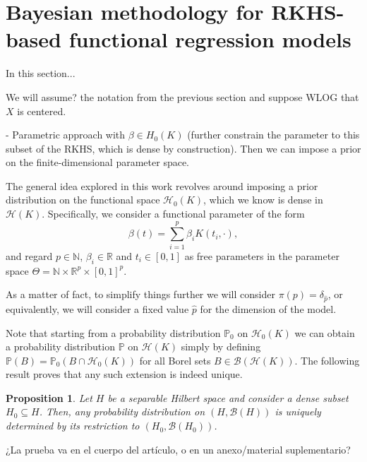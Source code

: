 \documentclass[ba]{imsart}
\numberwithin{equation}{section}
\theoremstyle{plain}
\newtheorem{prop}{Proposition}[section]
\newcommand{\N}{\mathbb{N}}
\newcommand{\R}{\mathbb{R}}
\newenvironment{comment}
{
\noindent \em \color{red}
}
{
\color{black}
}
\begin{document}
\section{Bayesian methodology for RKHS-based functional regression models}

In this section...

We will assume? the notation from the previous section and suppose WLOG that \(X\) is centered.

\begin{comment}

  - Parametric approach with \(\beta \in H_0(K)\) (further constrain the parameter to this subset of the RKHS, which is dense by construction). Then we can impose a prior on the finite-dimensional parameter space.
\end{comment}

The general idea explored in this work revolves around imposing a prior distribution on the functional space \(\mathcal H_0(K)\), which we know is dense in \(\mathcal H(K)\). Specifically, we consider a functional parameter of the form
\begin{equation}\label{eq:parameter-rkhs}
  \beta(t) = \sum_{i=1}^p \beta_i K(t_i, \cdot),
\end{equation}
and regard \(p \in \N\), \(\beta_i \in \R\) and \(t_i \in [0, 1]\) as free parameters in the parameter space \(\Theta = \N \times \R^p \times [0, 1]^p\).

As a matter of fact, to simplify things further we will consider \(\pi(p) = \delta_{\hat p}\), or equivalently, we will consider a fixed value \(\hat p\) for the dimension of the model.

Note that starting from a probability distribution \(\mathbb{P}_0\) on \(\mathcal H_0(K)\) we can obtain a probability distribution \(\mathbb{P}\) on \(\mathcal H(K)\) simply by defining \(\mathbb{P}(B) = \mathbb{P}_0(B\cap \mathcal H_0(K))\) for all Borel sets \(B \in \mathcal B(\mathcal H(K))\). The following result proves that any such extension is indeed unique.

\begin{prop} Let \(H\) be a separable Hilbert space and consider a dense subset \(H_0\subseteq H\). Then, any probability distribution on \((H, \mathcal{B}(H))\) is uniquely determined by its restriction to \((H_0, \mathcal B(H_0))\).
\end{prop}
\begin{comment}
    ¿La prueba va en el cuerpo del artículo, o en un anexo/material suplementario?
\end{comment}
\end{document}
